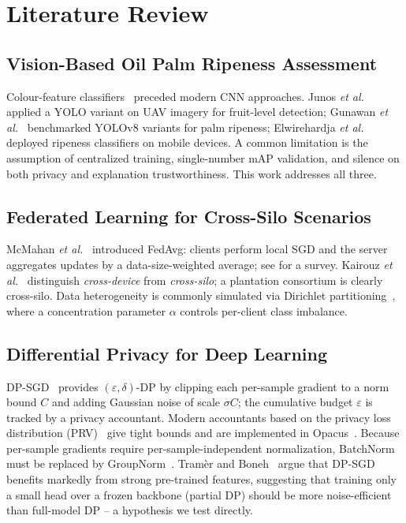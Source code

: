 \documentclass[twocolumn,a4paper,10pt]{article}
\begin{document}
\section{Literature Review}

\subsection{Vision-Based Oil Palm Ripeness Assessment}
Colour-feature classifiers~\cite{sabri2017} preceded modern CNN approaches.
Junos \emph{et al.}~\cite{junos2022} applied a YOLO variant on UAV imagery for
fruit-level detection; Gunawan \emph{et al.}~\cite{gunawan2023} benchmarked
YOLOv8 variants for palm ripeness; Elwirehardja \emph{et
al.}~\cite{elwirehardja2021} deployed ripeness classifiers on mobile devices. A
common limitation is the assumption of centralized training, single-number mAP
validation, and silence on both privacy and explanation trustworthiness. This
work addresses all three.

\subsection{Federated Learning for Cross-Silo Scenarios}
McMahan \emph{et al.}~\cite{fedavg} introduced FedAvg: clients perform local SGD
and the server aggregates updates by a data-size-weighted average; see
\cite{li2020} for a survey. Kairouz \emph{et al.}~\cite{kairouz2021} distinguish
\emph{cross-device} from \emph{cross-silo}; a plantation consortium is clearly
cross-silo. Data heterogeneity is commonly simulated via Dirichlet
partitioning~\cite{hsu2019}, where a concentration parameter $\alpha$ controls
per-client class imbalance.

\subsection{Differential Privacy for Deep Learning}
DP-SGD~\cite{abadi2016} provides $(\varepsilon,\delta)$-DP by clipping each
per-sample gradient to a norm bound $C$ and adding Gaussian noise of scale
$\sigma C$; the cumulative budget $\varepsilon$ is tracked by a privacy
accountant. Modern accountants based on the privacy loss distribution
(PRV)~\cite{gopi2021} give tight bounds and are implemented in
Opacus~\cite{opacus2021}. Because per-sample gradients require
per-sample-independent normalization, BatchNorm must be replaced by
GroupNorm~\cite{groupnorm}. Tram\`er and Boneh~\cite{tramer2021} argue that
DP-SGD benefits markedly from strong pre-trained features, suggesting that
training only a small head over a frozen backbone (partial DP) should be more
noise-efficient than full-model DP -- a hypothesis we test directly.
\end{document}
